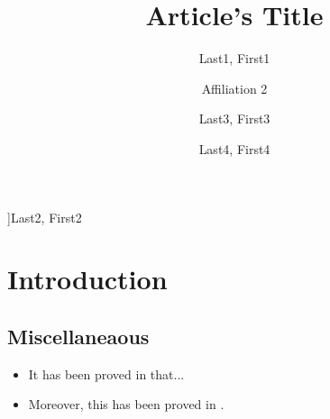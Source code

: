 \documentclass[
]{nwejmart}
\begin{document}
%
\title{Article's Title}
%
%
\author[affiliation={Affiliation 1}]{Last1, First1}
\author[affiliation=[aff2]{Affiliation 2}]{Last2, First2}
\author[affiliation={Affiliation 3},affiliation={Affiliation 3 bis}]{Last3, First3}
\author[affiliation={Affiliation 4},affiliationtagged={aff2}]{Last4, First4}
%
\begin{abstract}
  \lipsum[1]
\end{abstract}
%
%
%
%
%
\maketitle
%
\section*{Introduction}
%
\subsection{Miscellaneaous}
%
\begin{itemize}
\item It has been proved in  
  that...
\item Moreover, this has been proved in  .
\end{itemize}
%
\end{document}
